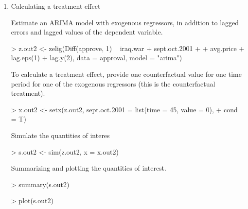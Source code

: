 \begin{enumerate}
\begin{center}
\end{center}

\item Calculating a treatment effect\newline

Estimate an ARIMA model with exogenous regressors, in addition to
lagged errors and lagged values of the dependent variable.

\begin{Schunk}
\begin{Sinput}
> z.out2 <- zelig(Diff(approve, 1) ~ iraq.war + sept.oct.2001 + 
+     avg.price + lag.eps(1) + lag.y(2), data = approval, model = "arima")
\end{Sinput}
\end{Schunk}
To calculate a treatment effect, provide one counterfactual value for
one time period for one of the exogenous regressors (this is the
counterfactual treatment). 
\begin{Schunk}
\begin{Sinput}
> x.out2 <- setx(z.out2, sept.oct.2001 = list(time = 45, value = 0), 
+     cond = T)
\end{Sinput}
\end{Schunk}
Simulate the quantities of interes
\begin{Schunk}
\begin{Sinput}
> s.out2 <- sim(z.out2, x = x.out2)
\end{Sinput}
\end{Schunk}
Summarizing and plotting the quantities of interest.
\begin{Schunk}
\begin{Sinput}
> summary(s.out2)
\end{Sinput}
\end{Schunk}
\begin{center}
\begin{Schunk}
\begin{Sinput}
> plot(s.out2)
\end{Sinput}
\end{Schunk}

\end{center}
\end{enumerate}
